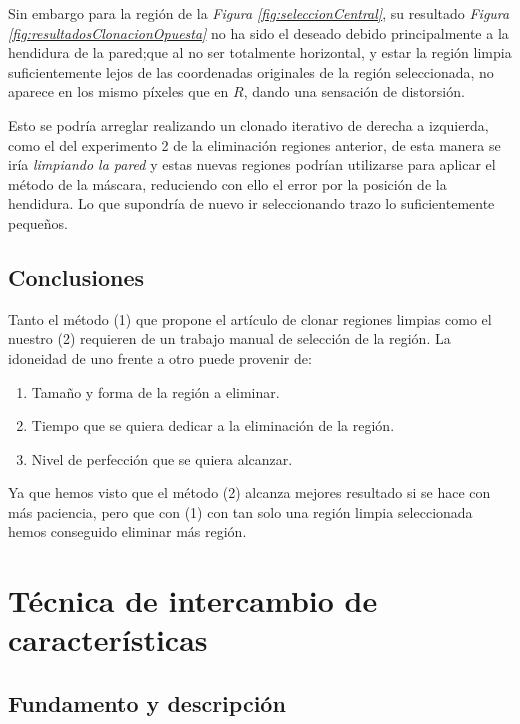 \documentclass[11pt,twoside,titlepage,a4paper]{article}
\numberwithin{equation}{section} %
\theoremstyle{usual}
\begin{document}
Sin embargo para la región de la \textit{Figura \ref{fig:seleccionCentral}}, su resultado \textit{Figura \ref{fig:resultadosClonacionOpuesta}} no ha sido el deseado debido principalmente a la hendidura de la pared;que al no ser totalmente horizontal, y estar la región limpia suficientemente lejos de las coordenadas originales de la región seleccionada, no aparece en los mismo píxeles que en $R$, dando una sensación de distorsión.    

Esto se podría arreglar realizando un clonado iterativo de derecha a izquierda, como el del experimento 2 de la eliminación regiones anterior, de esta manera se iría \textit{limpiando la pared} y estas nuevas regiones podrían utilizarse para aplicar el método de la máscara, reduciendo con ello el error por la posición de la hendidura. Lo que supondría de nuevo ir seleccionando trazo lo suficientemente pequeños. 

\subsection{Conclusiones}

Tanto el método (1)  que propone el artículo \cite{poissonImageEditing} de clonar regiones limpias como el nuestro (2) requieren de un trabajo manual de selección de la región. La idoneidad de uno frente a otro puede provenir de: 

\begin{enumerate}
    \item Tamaño y forma de la región a eliminar. 
    \item Tiempo que se quiera dedicar a la eliminación de la región. 
    \item Nivel de perfección que se quiera alcanzar. 
\end{enumerate}

Ya que hemos visto que el método (2) alcanza mejores resultado si se hace con más paciencia, pero que con (1) con tan solo una región limpia seleccionada hemos conseguido eliminar más región.

\newpage

\section{Técnica de intercambio de características}

\subsection{Fundamento y descripción}
\end{document}
